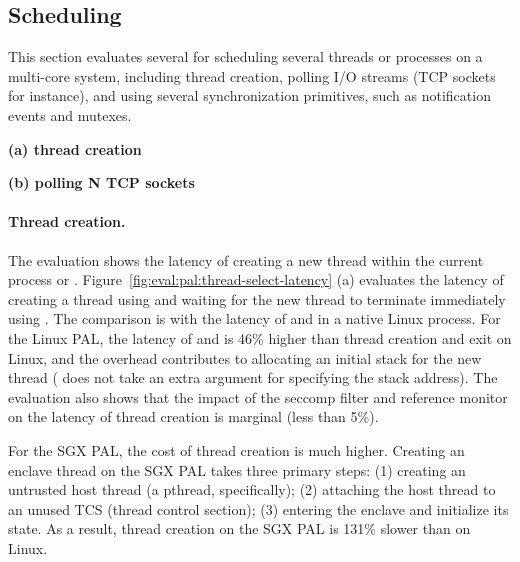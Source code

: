 \subsection{Scheduling}
\label{sec:eval:pal:sched}

This section evaluates several \hostapis{} for scheduling several threads or processes
on a multi-core system,
including thread creation, polling I/O streams (TCP sockets for instance), and using several synchronization primitives,
such as notification events and mutexes. 


\begin{figure*}[t!]
\centering
\footnotesize
{}
\parbox{0.49\textwidth}{\centering\bf (a) thread creation}
\parbox{0.49\textwidth}{\centering\bf (b) polling N TCP sockets}
\caption{(a) Thread creation latency and (b) latency of polling a number of TCP sockets.
Lower is better.
The comparison is between (1)  and  on Linux; (2)  and  on the Linux PAL, with and without a \seccomp{} filter ({\bf +SC}) and reference monitor ({\bf +RM}); (3) the same \hostapis{} on the SGX PAL.}
\label{fig:eval:pal:thread-select-latency}
\end{figure*}


\paragraph{Thread creation.}
The evaluation shows the latency of creating a new thread within the current process or \picoproc{}.
Figure~\ref{fig:eval:pal:thread-select-latency} (a)
evaluates the latency of creating a thread using  and waiting for the new thread to terminate immediately using .
The comparison is with the latency of 
and  in a native Linux process.
For the Linux PAL,
the latency of  and  is \roughly{}46\% higher
than thread creation and exit on Linux,
and the overhead contributes
to allocating an initial stack for the new thread ( does not take an extra argument for specifying the stack address).
The evaluation also shows that the impact of the seccomp{} filter and reference monitor on the latency of thread creation is marginal (less than 5\%).

For the SGX PAL, the cost of thread creation is much higher.
Creating an enclave thread on the SGX PAL takes three primary steps: (1) creating an untrusted host thread (a pthread, specifically); (2) attaching the host thread to an unused TCS (thread control section); (3) entering the enclave and initialize its state.
As a result, thread creation on the SGX PAL is \roughly{}131\% slower than  on Linux.




